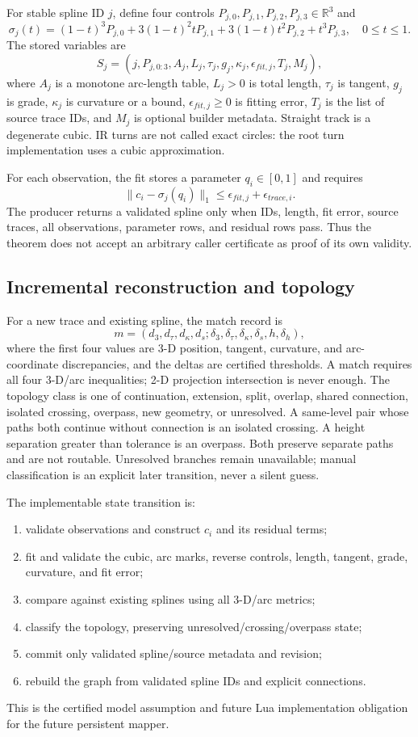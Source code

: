 \documentclass[10pt,a4paper]{article}
\newcommand{\Lean}[1]{\texttt{\detokenize{#1}}}
\newcommand{\model}{\textsf{certified model assumption}}
\newcommand{\obligation}{\textsf{future Lua implementation obligation}}
\begin{document}
For stable spline ID $j$, define four controls
$P_{j,0},P_{j,1},P_{j,2},P_{j,3}\in\mathbb{R}^3$ and
\[
 \sigma_j(t)=(1-t)^3P_{j,0}+3(1-t)^2tP_{j,1}
       +3(1-t)t^2P_{j,2}+t^3P_{j,3},\quad 0\leq t\leq1.
\]
The stored variables are
\[
 S_j=(j,P_{j,0:3},A_j,L_j,\tau_j,g_j,\kappa_j,
      \epsilon_{fit,j},T_j,M_j),
\]
where $A_j$ is a monotone arc-length table, $L_j>0$ is total length,
$\tau_j$ is tangent, $g_j$ is grade, $\kappa_j$ is curvature or a bound,
$\epsilon_{fit,j}\geq0$ is fitting error, $T_j$ is the list of source trace
IDs, and $M_j$ is optional builder metadata. Straight track is a degenerate
cubic. IR turns are not called exact circles: the root turn implementation
uses a cubic approximation.

For each observation, the fit stores a parameter $q_i\in[0,1]$ and requires
\[
 \|c_i-\sigma_j(q_i)\|_1
 \leq\epsilon_{fit,j}+\epsilon_{trace,i}.
\]
The producer \Lean{validatedSplineProducer} returns a validated spline only
when IDs, length, fit error, source traces, all observations, parameter rows,
and residual rows pass. Thus the theorem does not accept an arbitrary caller
certificate as proof of its own validity.

\subsection{Incremental reconstruction and topology}

For a new trace and existing spline, the match record is
\[
 m=(d_3,d_\tau,d_\kappa,d_s;\delta_3,\delta_\tau,
    \delta_\kappa,\delta_s,h,\delta_h),
\]
where the first four values are 3-D position, tangent, curvature, and
arc-coordinate discrepancies, and the deltas are certified thresholds. A
match requires all four 3-D/arc inequalities; 2-D projection intersection is
never enough. The topology class is one of continuation, extension, split,
overlap, shared connection, isolated crossing, overpass, new geometry, or
unresolved. A same-level pair whose paths both continue without connection is
an isolated crossing. A height separation greater than tolerance is an
overpass. Both preserve separate paths and are not routable. Unresolved
branches remain unavailable; manual classification is an explicit later
transition, never a silent guess.

The implementable state transition is:
\begin{enumerate}
 \item validate observations and construct $c_i$ and its residual terms;
 \item fit and validate the cubic, arc marks, reverse controls, length,
 tangent, grade, curvature, and fit error;
 \item compare against existing splines using all 3-D/arc metrics;
 \item classify the topology, preserving unresolved/crossing/overpass state;
 \item commit only validated spline/source metadata and revision;
 \item rebuild the graph from validated spline IDs and explicit connections.
\end{enumerate}
This is the \model{} and \obligation{} for the future persistent mapper.
\end{document}
